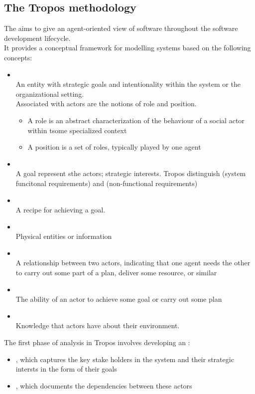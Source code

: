 \subsection{The Tropos methodology}
The  aims to give an agent-oriented view of software throughout the software development lifecycle.\\
It provides a conceptual framework for modelling systems based on the following concepts:
\begin{itemize}
\item {}\\
An entity with strategic goals and intentionality within the system or the organizational setting.\\
Associated with actors are the notions of role and position.
\begin{itemize}
\item A role is an abstract characterization of the behaviour of a social actor within tsome specialized context
\item A position is a set of roles, typically played by one agent
\end{itemize}
\item {}\\
A goal represent sthe actors; strategic interests. Tropos distinguish  (system funcitonal requirements) and  (non-functional requirements)
\item {}\\
A recipe for achieving a goal.
\item {}\\
Physical entities or information
\item {}\\
A relationship between two actors, indicating that one agent needs the other to carry out some part of a plan, deliver some resource, or similar
\item {}\\
The ability of an actor to achieve some goal or carry out some plan
\item {}\\
Knowledge that actors have about their environment.
\end{itemize}

The first phase of analysis in Tropos involves developing an :
\begin{itemize}
\item {}, which captures the key stake holders in the system and their strategic intersts in the form of their goals 
\item {}, which documents the dependencies between these actors
\end{itemize}

